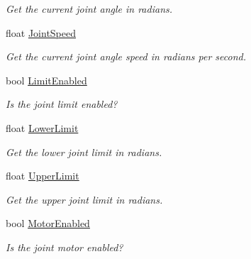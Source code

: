 \begin{DoxyCompactItemize}
\begin{DoxyCompactList}\small\item\em Get the current joint angle in radians. \end{DoxyCompactList}\item 
float \hyperlink{class_farseer_physics_1_1_dynamics_1_1_joints_1_1_revolute_joint_a92f200e7f0133f7903c642372d9afc4d}{Joint\+Speed}
\begin{DoxyCompactList}\small\item\em Get the current joint angle speed in radians per second. \end{DoxyCompactList}\item 
bool \hyperlink{class_farseer_physics_1_1_dynamics_1_1_joints_1_1_revolute_joint_a6aecb6df8ea5fb3efe6924a1cdbbcc48}{Limit\+Enabled}
\begin{DoxyCompactList}\small\item\em Is the joint limit enabled? \end{DoxyCompactList}\item 
float \hyperlink{class_farseer_physics_1_1_dynamics_1_1_joints_1_1_revolute_joint_ad2b96bea210036937036e3eed1a4c58a}{Lower\+Limit}
\begin{DoxyCompactList}\small\item\em Get the lower joint limit in radians. \end{DoxyCompactList}\item 
float \hyperlink{class_farseer_physics_1_1_dynamics_1_1_joints_1_1_revolute_joint_a466ec9962a629cd64a455e0ceac6b0f4}{Upper\+Limit}
\begin{DoxyCompactList}\small\item\em Get the upper joint limit in radians. \end{DoxyCompactList}\item 
bool \hyperlink{class_farseer_physics_1_1_dynamics_1_1_joints_1_1_revolute_joint_ae8688917ac794b28179dc088074363e1}{Motor\+Enabled}
\begin{DoxyCompactList}\small\item\em Is the joint motor enabled? \end{DoxyCompactList}\item 

\end{DoxyCompactItemize}
